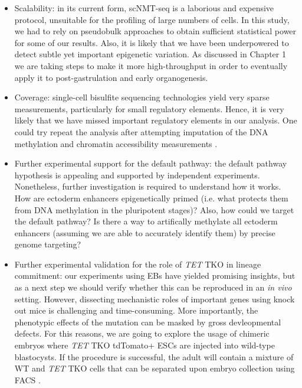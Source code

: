 \begin{itemize}
	\item Scalability: in its current form, scNMT-seq is a laborious and expensive protocol, unsuitable for the profiling of large numbers of cells. In this study, we had to rely on pseudobulk approaches to obtain sufficient statistical power for some of our results. Also, it is likely that we have been underpowered to detect subtle yet important epigenetic variation. As discussed in Chapter 1 we are taking steps to make it more high-throughput in order to eventually apply it to post-gastrulation and early organogenesis.

	\item Coverage: single-cell bisulfite sequencing technologies yield very sparse measurements, particularly for small regulatory elements. Hence, it is very likely that we have missed important regulatory elements in our analysis. One could try repeat the analysis after attempting imputation of the DNA methylation and chromatin accessibility measurements \cite{Angermueller2017}.

	\item Further experimental support for the default pathway: the default pathway hypothesis is appealing and supported by independent experiments. Nonetheless, further investigation is required to understand how it works. How are ectoderm enhancers epigenetically primed (i.e. what protects them from DNA methylation in the pluripotent stages)? Also, how could we target the default pathway? Is there a way to artifically methylate all ectoderm enhancers (assuming we are able to accurately identify them) by precise genome targeting?

	\item Further experimental validation for the role of \textit{TET} TKO in lineage commitment: our experiments using EBs have yielded promising insights, but as a next step we should verify whether this can be reproduced in an \textit{in vivo} setting. However, dissecting mechanistic roles of important genes using knock out mice is challenging and time-consuming. More importantly, the phenotypic effects of the mutation can be masked by gross devleopmental defects. For this reasons, we are going to explore the usage of chimeric embryos where \textit{TET} TKO tdTomato+ ESCs are injected into wild-type blastocysts. If the procedure is successful, the adult will contain a mixture of WT and \textit{TET} TKO cells that can be separated upon embryo collection using FACS \cite{Pijuan-Sala2019}.

\end{itemize}
